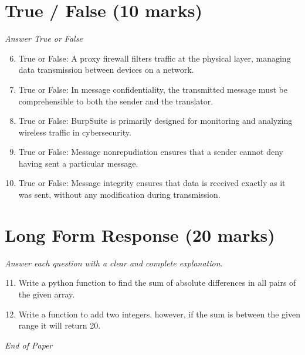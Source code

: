 \documentclass[12pt]{article}
\begin{document}
\section*{True / False (10 marks)}
\textit{Answer True or False}
\begin{enumerate}[label=\arabic*.]
\setcounter{enumi}{5}
\item True or False: A proxy firewall filters traffic at the physical layer, managing data transmission between devices on a network.
\item True or False: In message confidentiality, the transmitted message must be comprehensible to both the sender and the translator.
\item True or False: BurpSuite is primarily designed for monitoring and analyzing wireless traffic in cybersecurity.
\item True or False: Message nonrepudiation ensures that a sender cannot deny having sent a particular message.
\item True or False: Message integrity ensures that data is received exactly as it was sent, without any modification during transmission.
\end{enumerate}

\section*{Long Form Response (20 marks)}
\textit{Answer each question with a clear and complete explanation.}
\begin{enumerate}[label=\arabic*.]
\setcounter{enumi}{10}
\item Write a python function to find the sum of absolute differences in all pairs of the given array.
\item Write a function to add two integers. however, if the sum is between the given range it will return 20.
\end{enumerate}

\vfill
\noindent\textit{End of Paper}
\end{document}
